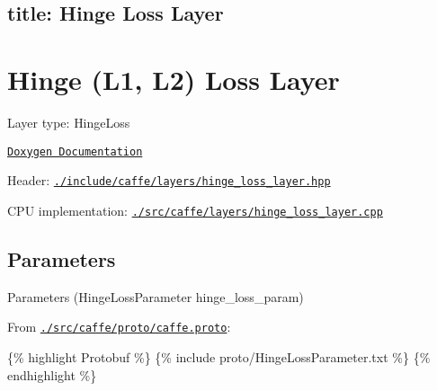 

 \subsection*{title\+: Hinge Loss Layer }

\section*{Hinge (L1, L2) Loss Layer}


\begin{DoxyItemize}
\item Layer type\+: {\ttfamily Hinge\+Loss}
\item \href{http://caffe.berkeleyvision.org/doxygen/classcaffe_1_1HingeLossLayer.html}{\tt Doxygen Documentation}
\item Header\+: \href{https://github.com/BVLC/caffe/blob/master/include/caffe/layers/hinge_loss_layer.hpp}{\tt {\ttfamily ./include/caffe/layers/hinge\+\_\+loss\+\_\+layer.hpp}}
\item C\+PU implementation\+: \href{https://github.com/BVLC/caffe/blob/master/src/caffe/layers/hinge_loss_layer.cpp}{\tt {\ttfamily ./src/caffe/layers/hinge\+\_\+loss\+\_\+layer.cpp}}
\end{DoxyItemize}

\subsection*{Parameters}


\begin{DoxyItemize}
\item Parameters ({\ttfamily Hinge\+Loss\+Parameter hinge\+\_\+loss\+\_\+param})
\item From \href{https://github.com/BVLC/caffe/blob/master/src/caffe/proto/caffe.proto}{\tt {\ttfamily ./src/caffe/proto/caffe.proto}}\+:
\end{DoxyItemize}

\{\% highlight Protobuf \%\} \{\% include proto/\+Hinge\+Loss\+Parameter.\+txt \%\} \{\% endhighlight \%\} 